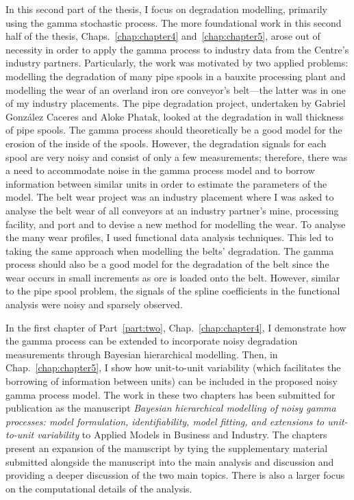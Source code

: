 \documentclass[apa,colorlinks,emptypage]{curtinThesis}
\begin{document}
In this second part of the thesis, I focus on degradation modelling, primarily using the gamma stochastic process. The more foundational work in this second half of the thesis, Chaps.~\ref{chap:chapter4} and~\ref{chap:chapter5}, arose out of necessity in order to apply the gamma process to industry data from the Centre's industry partners. Particularly, the work was motivated by two applied problems: modelling the degradation of many pipe spools in a bauxite processing plant and modelling the wear of an overland iron ore conveyor's belt---the latter was in one of my industry placements. The pipe degradation project, undertaken by Gabriel Gonz\'{a}lez Caceres and Aloke Phatak, looked at the degradation in wall thickness of pipe spools. The gamma process should theoretically be a good model for the erosion of the inside of the spools. However, the degradation signals for each spool are very noisy and consist of only a few measurements; therefore, there was a need to accommodate noise in the gamma process model and to borrow information between similar units in order to estimate the parameters of the model. The belt wear project was an industry placement where I was asked to analyse the belt wear of all conveyors at an industry partner's mine, processing facility, and port and to devise a new method for modelling the wear. To analyse the many wear profiles, I used functional data analysis techniques. This led to taking the same approach when modelling the belts' degradation. The gamma process should also be a good model for the degradation of the belt since the wear occurs in small increments as ore is loaded onto the belt. However, similar to the pipe spool problem, the signals of the spline coefficients in the functional analysis were noisy and sparsely observed.

In the first chapter of Part~\ref{part:two}, Chap.~\ref{chap:chapter4}, I demonstrate how the gamma process can be extended to incorporate noisy degradation measurements through Bayesian hierarchical modelling. Then, in Chap.~\ref{chap:chapter5}, I show how unit-to-unit variability (which facilitates the borrowing of information between units) can be included in the proposed noisy gamma process model. The work in these two chapters has been submitted for publication as the manuscript \textit{Bayesian hierarchical modelling of noisy gamma processes: model formulation, identifiability, model fitting, and extensions to unit-to-unit variability} to Applied Models in Business and Industry. The chapters present an expansion of the manuscript by tying the supplementary material submitted alongside the manuscript into the main analysis and discussion and providing a deeper discussion of the two main topics. There is also a larger focus on the computational details of the analysis.
\end{document}
